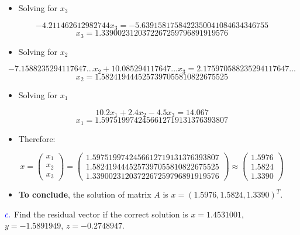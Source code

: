 \documentclass[
]{article}
\providecommand{\tightlist}{%
  \setlength{\itemsep}{0pt}\setlength{\parskip}{0pt}}
\begin{document}
\begin{itemize}
\tightlist
\item
  Solving for \(x_{3}\)
\end{itemize}

\[-4.211462612982744x_{3} = -5.6391581758422350041084634346755\]
\[x_{3} = 1.3390023120372267259796891919576\]

\begin{itemize}
\tightlist
\item
  Solving for \(x_{2}\)
\end{itemize}

\[-7.1588235294117647...x_{2} + 10.085294117647...x_{3} = 2.175970588235294117647...\]
\[x_{2} = 1.5824194445257397055810822675525\]

\begin{itemize}
\tightlist
\item
  Solving for \(x_{1}\)
\end{itemize}

\[10.2x_{1} + 2.4x_{2} -4.5x_{3} = 14.067\]
\[x_{1} = 1.5975199742456612719131376393807\]

\begin{itemize}
\tightlist
\item
  Therefore:
\end{itemize}

\[
    x = 
    \begin{pmatrix}
      x_{1} \\
      x_{2} \\
      x_{3} 
    \end{pmatrix}
    = 
    \begin{pmatrix}
      1.5975199742456612719131376393807 \\
      1.5824194445257397055810822675525 \\
      1.3390023120372267259796891919576
    \end{pmatrix}
    \approx
    \begin{pmatrix}
      1.5976 \\
      1.5824 \\
      1.3390 
    \end{pmatrix}
   \]

\begin{itemize}
\tightlist
\item
  \textbf{To conclude}, the solution of matrix \(A\) is
  \(x = (1.5976, 1.5824, 1.3390)^{T}\).
\end{itemize}

\(\textcolor{blue}{c.}\) Find the residual vector if the correct
solution is \(x = 1.4531001\), \(y = -1.5891949\), \(z = -0.2748947\).
\end{document}
